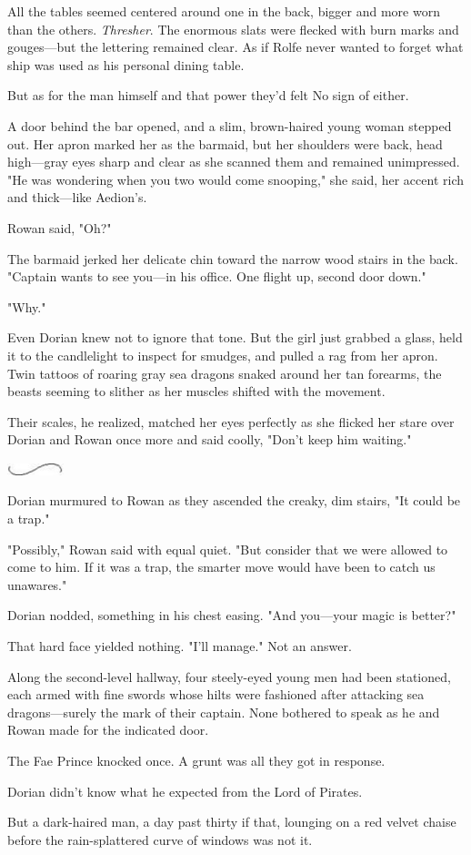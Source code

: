 All the tables seemed centered around one in the back, bigger and more worn than the others. \emph{Thresher}. The enormous slats were flecked with burn marks and gouges---but the lettering remained clear. As if Rolfe never wanted to forget what ship was used as his personal dining table.

But as for the man himself and that power they'd felt  No sign of either.

A door behind the bar opened, and a slim, brown-haired young woman stepped out. Her apron marked her as the barmaid, but her shoulders were back, head high---gray eyes sharp and clear as she scanned them and remained unimpressed. "He was wondering when you two would come snooping," she said, her accent rich and thick---like Aedion's.

Rowan said, "Oh?"

The barmaid jerked her delicate chin toward the narrow wood stairs in the back. "Captain wants to see you---in his office. One flight up, second door down."

"Why."

Even Dorian knew not to ignore that tone. But the girl just grabbed a glass, held it to the candlelight to inspect for smudges, and pulled a rag from her apron. Twin tattoos of roaring gray sea dragons snaked around her tan forearms, the beasts seeming to slither as her muscles shifted with the movement.

Their scales, he realized, matched her eyes perfectly as she flicked her stare over Dorian and Rowan once more and said coolly, "Don't keep him waiting."

\includegraphics[width=0.65in,height=0.13in]{images/seperator}

Dorian murmured to Rowan as they ascended the creaky, dim stairs, "It could be a trap."

"Possibly," Rowan said with equal quiet. "But consider that we were allowed to come to him. If it was a trap, the smarter move would have been to catch us unawares."

Dorian nodded, something in his chest easing. "And you---your magic is
 better?"

That hard face yielded nothing. "I'll manage." Not an answer.

Along the second-level hallway, four steely-eyed young men had been stationed, each armed with fine swords whose hilts were fashioned after attacking sea dragons---surely the mark of their captain. None bothered to speak as he and Rowan made for the indicated door.

The Fae Prince knocked once. A grunt was all they got in response.

Dorian didn't know what he expected from the Lord of Pirates.

But a dark-haired man, a day past thirty if that, lounging on a red velvet chaise before the rain-splattered curve of windows was not it.

